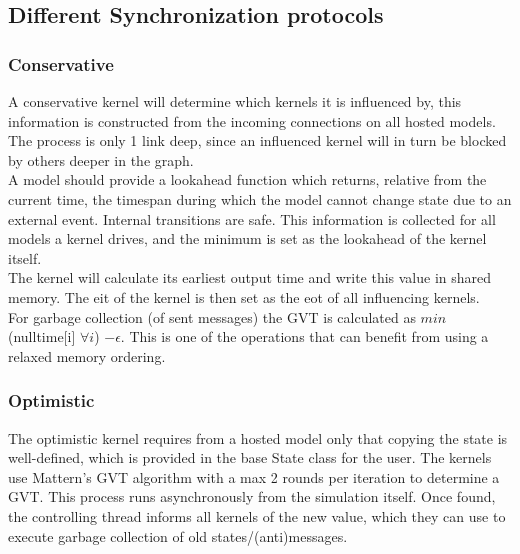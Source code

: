 \subsection{Different Synchronization protocols}
\subsubsection{Conservative}
A conservative kernel will determine which kernels it is influenced by, this information is constructed from the incoming connections on all hosted models. The process is only 1 link deep, since an influenced kernel will in turn be blocked by others deeper in the graph.\\
A model should provide a lookahead function which returns, relative from the current time, the timespan during which the model cannot change state due to an external event. Internal transitions are safe. This information is collected for all models a kernel drives, and the minimum is set as the lookahead of the kernel itself. \\
The kernel will calculate its earliest output time and write this value in shared memory. The eit of the kernel is then set as the eot of all influencing kernels. \\
For garbage collection (of sent messages) the GVT is calculated as $min$(nulltime[i] $\forall i$) $ - \epsilon $. This is one of the operations that can benefit from using a relaxed memory ordering. %

\subsubsection{Optimistic}
The optimistic kernel requires from a hosted model only that copying the state is well-defined, which is provided in the base State class for the user.%
The kernels use Mattern's %
GVT algorithm with a max 2 rounds per iteration to determine a GVT. This process runs asynchronously from the simulation itself. Once found, the controlling thread informs all kernels of the new value, which they can use to execute garbage collection of old states/(anti)messages. 

